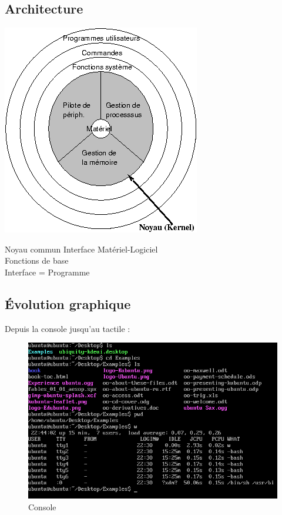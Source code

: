 \documentclass{beamer}
\begin{document}
\subsection*{Architecture}
\begin{frame}
\begin{center}
\includegraphics[width=0.4\linewidth]{images/kernel}
\begin{block}{Noyau commun}
Interface Matériel-Logiciel\\
Fonctions de base\\
Interface = Programme
\end{block}
\end{center}

\end{frame}

\subsection{\'Evolution graphique}
\begin{frame}
  \center Depuis la console jusqu'au tactile :
  \begin{figure}
    \includegraphics[width=0.8\linewidth]{images/console0}
    \caption{Console}
  \end{figure}
\end{frame}
\end{document}
